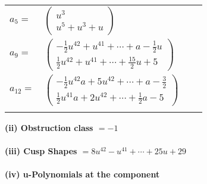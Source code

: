 \documentclass[1p]{elsarticle_modified}
\theoremstyle{definition}
\begin{document}
\begin{tabular}{m{7pt} m{180pt} m{7pt} m{180pt} }
\flushright $a_{5}=$&$\begin{pmatrix}u^3\\u^5+u^3+u\end{pmatrix}$ \\
\flushright $a_{9}=$&$\begin{pmatrix}-\frac{1}{2} u^{42}+u^{41}+\cdots+a-\frac{1}{2} u\\\frac{1}{2} u^{42}+u^{41}+\cdots+\frac{15}{2} u+5\end{pmatrix}$ \\
\flushright $a_{12}=$&$\begin{pmatrix}-\frac{1}{2} u^{42} a+5 u^{42}+\cdots+a-\frac{3}{2}\\\frac{1}{2} u^{41} a+2 u^{42}+\cdots+\frac{1}{2} a-5\end{pmatrix}$\\&\end{tabular}
\flushleft \textbf{(ii) Obstruction class $= -1$}\\~\\
\flushleft \textbf{(iii) Cusp Shapes $= 8 u^{42}- u^{41}+\cdots+25 u+29$}\\~\\
\newpage\renewcommand{\arraystretch}{1}
\flushleft \textbf{(iv) u-Polynomials at the component}\newline \\
\end{document}
